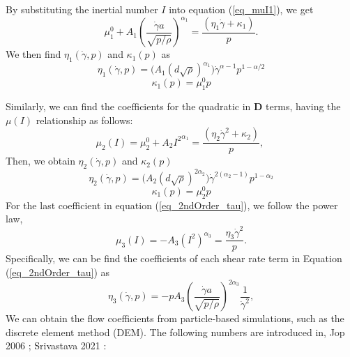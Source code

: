 By substituting the inertial number $I$ into equation (\ref{eq_muI1}), we get
\begin{equation}
     \mu_1^0 + A_1 {\left(  \frac{\dot{\gamma} a }{\sqrt{p/\rho}}\right) }^{ \alpha_1} =  \frac{(\eta_1 \dot{\gamma} + \kappa_1)}{p}.
\end{equation}
We then find $\eta_1 (\dot{\gamma}, p)$ and $\kappa_1(p)$ as
\begin{equation}
    \eta_1  (\dot{\gamma}, p)= 
    \biggl( A_1 {\left(   d  \sqrt{\rho} \right) }^{ \alpha_1}\biggr) 
     \dot{\gamma}^{\alpha-1} p^{1-\alpha/2}
\label{eq_eta1}
\end{equation}
\begin{equation}
    \kappa_1(p) = \mu_1^0 p
\label{eq_kappa1}
\end{equation}
\par
Similarly, we can find the coefficients for the quadratic in ${\bm D}$ terms, having the $\mu(I)$ relationship as follows:
\begin{equation}
    \mu_2(I) = \mu_2^0 + A_2{ I^2}^{ \alpha_1} =  \frac{(\eta_2 \dot{\gamma}^2 + \kappa_2)}{p},\
\label{eq_muI2}
\end{equation}
Then, we obtain $\eta_2 (\dot{\gamma}, p)$ and $\kappa_2(p)$
\begin{equation}
    \eta_2  (\dot{\gamma}, p)= 
    \biggl( A_2 {\left(   d  \sqrt{\rho} \right) }^{ 2\alpha_2}\biggr) 
     {\dot{\gamma}}^{2(\alpha_2-1)} p^{1-\alpha_2}
\label{eq_eta2}
\end{equation}
\begin{equation}
    \kappa_1(p) = \mu_2^0 p
\label{eq_kappa2}
\end{equation}
For the last coefficient in equation (\ref{eq_2ndOrder_tau}), we follow the power law, 
\begin{equation}
    \mu_3(I) = -A_3 \left( I^2 \right)^{\alpha_3} = \frac{\eta_3 \dot{\gamma}^2}{p}.
\label{eq_muI3}
\end{equation}
Specifically, we can be find the coefficients of each shear rate term in Equation (\ref{eq_2ndOrder_tau}) as
\begin{equation}
     \eta_3 (\dot{\gamma}, p) = 
    -p A_3 
        \left( \frac{\dot{\gamma} a }{\sqrt{p/\rho}}  \right)^{2\alpha_3} 
        \frac{1}{\dot{\gamma}^2},
\label{eq_gr_eta_3}
\end{equation}
We can obtain the flow coefficients from particle-based simulations, such as the discrete element method (DEM). The following numbers are introduced in, Jop 2006 \cite{jop_constitutive_2006}; Srivastava 2021 \cite{srivastava_viscometric_2021}:
